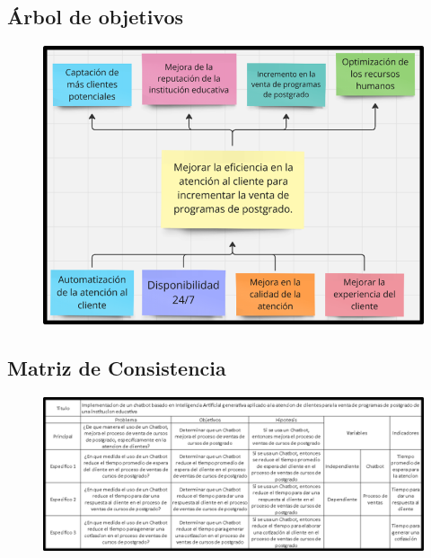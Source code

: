 \documentclass[10pt,a4paper]{article}
\begin{document}

    \subsection{Árbol de objetivos}

	
	\begin{figure}[H]
		\includegraphics[scale=0.80]{ArbolObjetivos.png} \hfill 
	\end{figure}
  

    \subsection{Matriz de Consistencia} 
	
	\begin{figure}[H]
		\includegraphics[scale=0.5]{MatrizConsistencia.png} \hfill 
	\end{figure}
	
\end{document}
